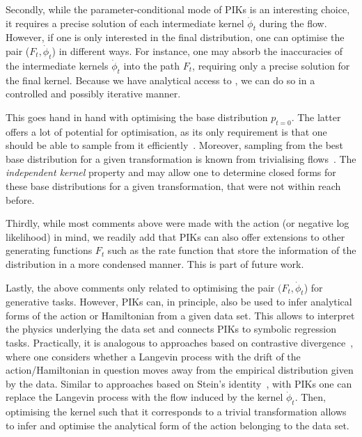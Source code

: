 \documentclass[reprint,amsmath,amssymb,aps,pra,superscriptaddress,nofootinbib,twocolumn,floatfix,nolongbibliography]{revtex4-2}
\begin{document}
Secondly, while the parameter-conditional mode of PIKs is an interesting choice, it requires a precise solution of each intermediate kernel $\dot{\phi}_t$ during the flow. However, if one is only interested in the final distribution, one can optimise the pair ($F_t, \dot{\phi}_t$) in different ways. For instance, one may absorb the inaccuracies of the intermediate kernels $\dot{\phi}_t$ into the path $F_t$, requiring only a precise solution for the final kernel. Because we have analytical access to , we can do so in a controlled and possibly iterative manner. 

This goes hand in hand with optimising the base distribution $p_{t=0}$. The latter offers a lot of potential for optimisation, as its only requirement is that one should be able to sample from it efficiently~\cite{Bauer:2024byr}. Moreover, sampling from the best base distribution for a given transformation is known from trivialising flows~\cite{Luscher:2009eq,Albandea:2023wgd,Albandea:2023ais,Foreman:2021ljl}. The \textit{independent kernel} property and  may allow one to determine closed forms for these base distributions for a given transformation, that were not within reach before.

Thirdly, while most comments above were made with the action (or negative log likelihood) in mind, we readily add that PIKs can also offer extensions to other generating functions $F_t$ such as the rate function that store the information of the distribution in a more condensed manner. This is part of future work. 

Lastly, the above comments only related to optimising the pair $(F_t, \dot{\phi}_t$) for generative tasks. However, PIKs can, in principle, also be used to infer analytical forms of the action or Hamiltonian from a given data set. This allows to interpret the physics underlying the data set and connects PIKs to symbolic regression tasks. Practically, it is analogous to approaches based on contrastive divergence~\cite{Hinton:2002tpe}, where one considers whether a Langevin process with the drift of the action/Hamiltonian in question moves away from the empirical distribution given by the data. Similar to approaches based on Stein's identity~\cite{Liu:2016svg,Grathwohl:2020fzl}, with PIKs one can replace the Langevin process with the flow induced by the kernel $\dot{\phi}_t$. Then, optimising the kernel such that it corresponds to a trivial transformation allows to infer and optimise the analytical form of the action belonging to the data set.\vspace{2mm}
\end{document}
